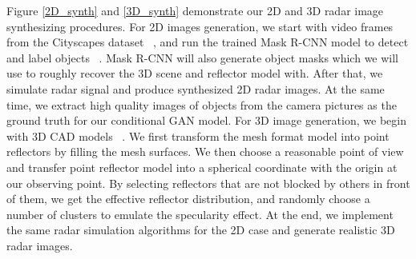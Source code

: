 Figure \ref{2D_synth} and \ref{3D_synth} demonstrate our 2D and 3D radar image synthesizing procedures. For 2D images generation, we start with video frames from the Cityscapes dataset ~\cite{cityscapes}, and run the trained Mask R-CNN model to detect and label objects ~\cite{rcnn}. Mask R-CNN will also generate object masks which we will use to roughly recover the 3D scene and reflector model with. After that, we simulate radar signal and produce synthesized 2D radar images. At the same time, we extract high quality images of objects from the camera pictures as the ground truth for our conditional GAN model. For 3D image generation, we begin with 3D CAD models ~\cite{3Ddata}. We first transform the mesh format model into point reflectors by filling the mesh surfaces. We then choose a reasonable point of view and transfer point reflector model into a spherical coordinate with the origin at our observing point. By selecting reflectors that are not blocked by others in front of them, we get the effective reflector distribution, and randomly choose a number of clusters to emulate the specularity effect. At the end, we implement the same radar simulation algorithms for the 2D case and generate realistic 3D radar images. 

